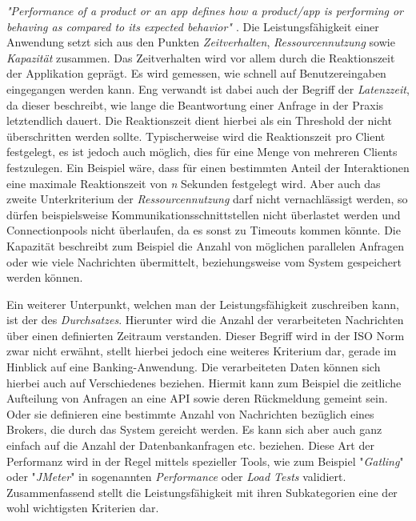 \emph{"Performance of a product or an app defines how a product/app is performing or behaving as compared to its expected behavior" \cite{nfr-dotnetcurry}}. Die Leistungsfähigkeit einer Anwendung setzt sich aus den Punkten \emph{Zeitverhalten}, \emph{Ressourcennutzung} sowie \emph{Kapazität} zusammen. Das Zeitverhalten wird vor allem durch die Reaktionszeit der Applikation geprägt. Es wird gemessen, wie schnell auf Benutzereingaben eingegangen werden kann. Eng verwandt ist dabei auch der Begriff der \emph{Latenzzeit}, da dieser beschreibt, wie lange die Beantwortung einer Anfrage in der Praxis letztendlich dauert. Die Reaktionszeit dient hierbei als ein Threshold der nicht überschritten werden sollte. Typischerweise wird die Reaktionszeit pro Client festgelegt, es ist jedoch auch möglich, dies für eine Menge von mehreren Clients festzulegen. Ein Beispiel wäre, dass für einen bestimmten Anteil der Interaktionen eine maximale Reaktionszeit von \emph{n} Sekunden festgelegt wird. Aber auch das zweite Unterkriterium der \emph{Ressourcennutzung} darf nicht vernachlässigt werden, so dürfen beispielsweise Kommunikationsschnittstellen nicht überlastet werden und Connectionpools nicht überlaufen, da es sonst zu Timeouts kommen könnte. Die Kapazität beschreibt zum Beispiel die Anzahl von möglichen parallelen Anfragen oder wie viele Nachrichten übermittelt, beziehungsweise vom System gespeichert werden können. 

Ein weiterer Unterpunkt, welchen man der Leistungsfähigkeit zuschreiben kann, ist der des \emph{Durchsatzes}. Hierunter wird die Anzahl der verarbeiteten Nachrichten über einen definierten Zeitraum verstanden. Dieser Begriff wird in der ISO Norm zwar nicht erwähnt, stellt hierbei jedoch eine weiteres Kriterium dar, gerade im Hinblick auf eine Banking-Anwendung. Die verarbeiteten Daten können sich hierbei auch auf Verschiedenes beziehen. Hiermit kann zum Beispiel die zeitliche Aufteilung von Anfragen an eine API sowie deren Rückmeldung gemeint sein. Oder sie definieren eine bestimmte Anzahl von Nachrichten bezüglich eines Brokers, die durch das System gereicht werden. Es kann sich aber auch ganz einfach auf die Anzahl der Datenbankanfragen etc. beziehen. Diese Art der Performanz wird in der Regel mittels spezieller Tools, wie zum Beispiel "\emph{Gatling}" oder "\emph{JMeter}" in sogenannten \emph{Performance} oder \emph{Load Tests} validiert. Zusammenfassend stellt die Leistungsfähigkeit mit ihren Subkategorien eine der wohl wichtigsten Kriterien dar.


